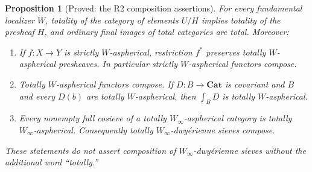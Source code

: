 \documentclass[11pt,a4paper]{article}
\newtheorem{proposition}[theorem]{Proposition}
\theoremstyle{definition}
\theoremstyle{remark}
\newcommand{\Cat}{\mathbf{Cat}}
\newcommand{\Winfty}{W_\infty}
\begin{document}
\begin{proposition}[Proved: the R2 composition assertions]\label{B:R2-audit}
For every fundamental localizer $W$, totality of the category of elements $U/H$ implies totality of the presheaf $H$, and ordinary final images of total categories are total. Moreover:
\begin{enumerate}[label=\textup{(\roman*)}]
\item If $f:X\to Y$ is strictly $W$-aspherical, restriction $f^*$ preserves totally $W$-aspherical presheaves. In particular strictly $W$-aspherical functors compose.
\item Totally $W$-aspherical functors compose. If $D:B\to\Cat$ is covariant and $B$ and every $D(b)$ are totally $W$-aspherical, then $\int_BD$ is totally $W$-aspherical.
\item Every nonempty full cosieve of a totally $\Winfty$-aspherical category is totally $\Winfty$-aspherical. Consequently totally $\Winfty$-dwy\'erienne sieves compose.
\end{enumerate}
These statements do not assert composition of $\Winfty$-dwy\'erienne sieves without the additional word ``totally.''
\end{proposition}
\end{document}
